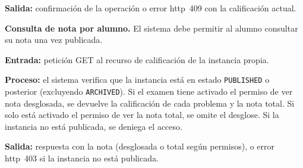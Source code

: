 \begin{functional}
    \textbf{Salida:} confirmación de la operación o error \acs{http}~409 con la
    calificación actual.

    \item \textbf{Consulta de nota por alumno.} \label{rf:grading:student}
    El sistema debe permitir al alumno consultar su nota una vez publicada.

    \textbf{Entrada:} petición GET al recurso de calificación de la instancia propia.

    \textbf{Proceso:} el sistema verifica que la instancia está en estado
    \texttt{PUBLISHED} o posterior (excluyendo \texttt{ARCHIVED}). Si el examen tiene
    activado el permiso de ver nota desglosada, se devuelve la calificación de cada
    problema y la nota total. Si solo está activado el permiso de ver la nota total, se
    omite el desglose. Si la instancia no está publicada, se deniega el acceso.

    \textbf{Salida:} respuesta con la nota (desglosada o total según permisos), o error
    \acs{http}~403 si la instancia no está publicada.

\end{functional}
